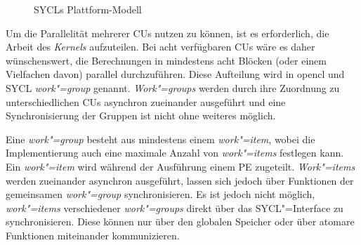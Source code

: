 \begin{figure}
    \caption[SYCLs Plattform-Modell]
            {SYCLs Plattform-Modell \cite[nach][23]{opencl2012}}
    \label{sycl:konzepte:abstraktion:plattform}
\end{figure}

Um die Parallelität mehrerer CUs nutzen zu können, ist es erforderlich, die
Arbeit des \textit{Kernels} aufzuteilen. Bei acht verfügbaren CUs wäre es daher
wünschenswert, die Berechnungen in mindestens acht Blöcken (oder einem
Vielfachen davon) parallel durchzuführen. Diese Aufteilung wird in \gls{opencl}
und SYCL \textit{work"=group} genannt. \textit{Work"=groups} werden durch ihre
Zuordnung zu unterschiedlichen CUs asynchron zueinander ausgeführt und eine
Synchronisierung der Gruppen ist nicht ohne weiteres möglich.

Eine \textit{work"=group} besteht aus mindestens einem \textit{work"=item},
wobei die Implementierung auch eine maximale Anzahl von \textit{work"=items}
festlegen kann. Ein \textit{work"=item} wird während der Ausführung einem PE
zugeteilt. \textit{Work"=items} werden zueinander asynchron ausgeführt, lassen
sich jedoch über Funktionen der gemeinsamen \textit{work"=group}
synchronisieren. Es ist jedoch nicht möglich, \textit{work"=items} verschiedener
\textit{work"=groups} direkt über das SYCL"=Interface zu synchronisieren. Diese
können nur über den globalen Speicher oder über atomare Funktionen miteinander
kommunizieren.

